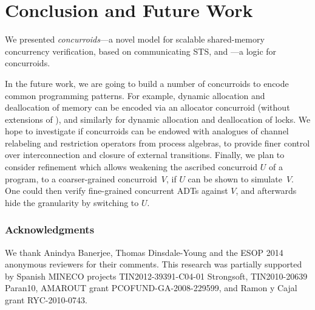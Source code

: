 
\section{Conclusion and Future Work}
\label{sec:conclusion}

We presented \emph{concurroids}---a novel model for scalable
shared-memory concurrency verification, based on communicating STS, and
\SCST---a logic for concurroids.

In the future work, we are going to build a number of concurroids to
encode common programming patterns. For example, dynamic allocation
and deallocation of memory can be encoded via an allocator concurroid
(without extensions of \SCST), and similarly for dynamic allocation
and deallocation of locks.
%
%
We hope to investigate if concurroids can be endowed with analogues of
channel relabeling and restriction operators from process algebras, to
provide finer control over interconnection and closure of external
transitions.
%
Finally, we plan to consider refinement which allows weakening the
ascribed concurroid $U$ of a program, to a coarser-grained
concurroid~$V$, if $U$ can be shown to simulate~$V$. One could then
verify fine-grained concurrent ADTs against $V$, and afterwards hide
the granularity by switching to $U$.


\subsubsection*{Acknowledgments}

We thank Anindya Banerjee, Thomas Dinsdale-Young and the ESOP 2014
anonymous reviewers for their comments.
This research was
partially supported by Spanish MINECO projects TIN2012-39391-C04-01
Strongsoft, TIN2010-20639 Paran10, AMAROUT grant 
PCOFUND-GA-2008-229599, and Ramon y Cajal grant RYC-2010-0743.
